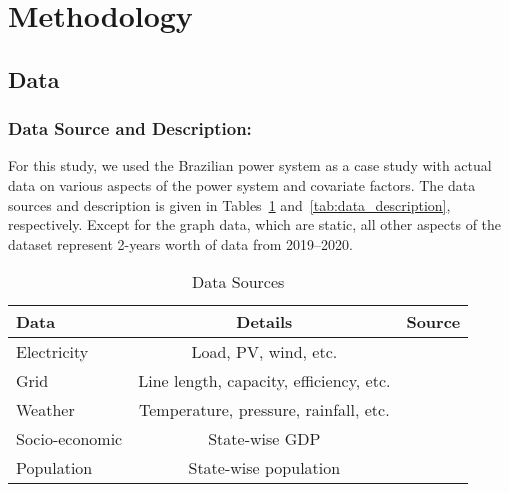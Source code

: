 \documentclass[sigconf,nonacm]{acmart}
\begin{document}
\section{Methodology}
\label{sec:methodology} 
\subsection{Data}

\subsubsection{\textbf{Data Source and Description}:}

For this study, we used the Brazilian power system as a case study with actual data on various aspects of the power system and covariate factors. The data sources and description is given in Tables~\ref{tab:data_sources} and~\ref{tab:data_description}, respectively. Except for the graph data, which are static, all other aspects of the dataset represent 2-years worth of data from 2019--2020.

\begin{table}[h!]
  \caption{Data Sources}
  \label{tab:data_sources}
  \begin{tabular}{lcl}
    \toprule
    Data & Details & Source \\
    \midrule
    Electricity & Load, PV, wind, etc. & \cite{deng2023harmonized} \\
    Grid & Line length, capacity, efficiency, etc. & \cite{deng2023harmonized} \\
    Weather & Temperature, pressure, rainfall, etc. & \cite{BrazilWeather} \\
    Socio-economic & State-wise GDP & \cite{BrazilGDP} \\
    Population & State-wise population & \cite{BrazilPopulation} \\
    \bottomrule
  \end{tabular}
\end{table}
\end{document}
